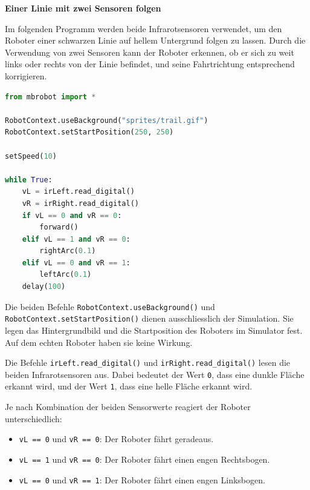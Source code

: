\begin{myexample}
    \textbf{Einer Linie mit zwei Sensoren folgen}

    Im folgenden Programm werden beide Infrarotsensoren
    verwendet, um den Roboter einer schwarzen Linie auf
    hellem Untergrund folgen zu lassen. Durch die Verwendung
    von zwei Sensoren kann der Roboter erkennen, ob er sich
    zu weit links oder rechts von der Linie befindet,
    und seine Fahrtrichtung entsprechend korrigieren.

    \begin{lstlisting}[language=Python]
from mbrobot import *

RobotContext.useBackground("sprites/trail.gif")
RobotContext.setStartPosition(250, 250)

setSpeed(10)

while True:
    vL = irLeft.read_digital()
    vR = irRight.read_digital()
    if vL == 0 and vR == 0:
        forward()
    elif vL == 1 and vR == 0:
        rightArc(0.1)
    elif vL == 0 and vR == 1:
        leftArc(0.1)
    delay(100)
    \end{lstlisting}

    \begin{sloppypar}
    Die beiden Befehle
    \texttt{RobotContext.useBackground()} und
    \texttt{RobotContext.setStartPosition()} dienen
    ausschliesslich der Simulation. Sie legen das Hintergrundbild
    und die Startposition des Roboters im Simulator fest.
    Auf dem echten Roboter haben sie keine Wirkung.
    \end{sloppypar}

    Die Befehle \texttt{irLeft.read\_digital()} und
    \texttt{irRight.read\_digital()} lesen die beiden
    Infrarotsensoren aus. Dabei bedeutet der Wert
    \texttt{0}, dass eine dunkle Fläche erkannt wird,
    und der Wert \texttt{1}, dass eine helle Fläche
    erkannt wird.

    Je nach Kombination der beiden Sensorwerte
    reagiert der Roboter unterschiedlich:
    \begin{itemize}
        \item \texttt{vL == 0} und \texttt{vR == 0}:
              Der Roboter fährt geradeaus.
        \item \texttt{vL == 1} und \texttt{vR == 0}:
              Der Roboter fährt einen engen Rechtsbogen.
        \item \texttt{vL == 0} und \texttt{vR == 1}:
              Der Roboter fährt einen engen Linksbogen.
    \end{itemize}


\end{myexample}
